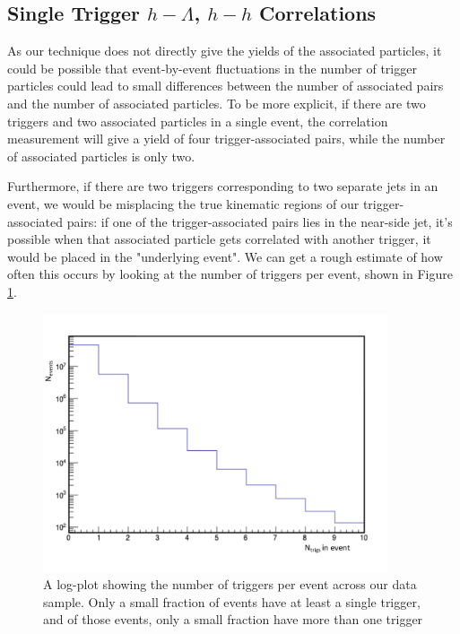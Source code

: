 \documentclass[ALICE,manyauthors]{ALICE_analysis_notes}
\begin{document}
\clearpage

\subsection{Single Trigger $h-\Lambda$, $h-h$ Correlations}

As our technique does not directly give the yields of the associated particles, it could be possible that event-by-event fluctuations in the number of trigger particles could lead to small differences between the number of associated pairs and the number of associated particles. To be more explicit, if there are two triggers and two associated particles in a single event, the correlation measurement will give a yield of four trigger-associated pairs, while the number of associated particles is only two. 

Furthermore, if there are two triggers corresponding to two separate jets in an event, we would be misplacing the true kinematic regions of our trigger-associated pairs: if one of the trigger-associated pairs lies in the near-side jet, it's possible when that associated particle gets correlated with another trigger, it would be placed in the "underlying event". We can get a rough estimate of how often this occurs by looking at the number of triggers per event, shown in Figure \ref{trigs_per_event}.

\begin{figure}[ht]
\centering
\includegraphics[width=4in]{figures/trig_per_event.pdf}
\caption{A log-plot showing the number of triggers per event across our data sample. Only a small fraction of events have at least a single trigger, and of those events, only a small fraction have more than one trigger}
\label{trigs_per_event}
\end{figure}
\end{document}
